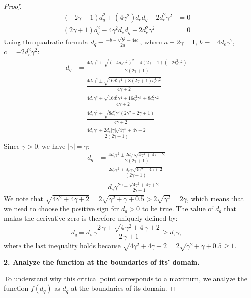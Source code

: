 \begin{proof}
\begin{align*}
(-2\gamma - 1) d_q^2 + (4\gamma^2) d_e d_q + 2d_e^2 \gamma^2 &= 0 \\
(2\gamma + 1) d_q^2 - 4\gamma^2 d_e d_q - 2d_e^2 \gamma^2 &= 0
\end{align*}
Using the quadratic formula $d_q = \frac{-b \pm \sqrt{b^2 - 4ac}}{2a}$, where $a = 2\gamma + 1$, $b = -4 d_e \gamma^2$, $c = -2 d_e^2 \gamma^2$:
\begin{align*}
d_q &= \frac{4 d_e \gamma^2 \pm \sqrt{(-4 d_e \gamma^2)^2 - 4 (2\gamma + 1) (-2 d_e^2 \gamma^2)}}{2 (2\gamma + 1)} \\
&= \frac{4 d_e \gamma^2 \pm \sqrt{16 d_e^2 \gamma^4 + 8 (2\gamma + 1) d_e^2 \gamma^2}}{4\gamma + 2} \\
&= \frac{4 d_e \gamma^2 \pm \sqrt{16 d_e^2 \gamma^4 + 16 d_e^2 \gamma^3 + 8 d_e^2 \gamma^2}}{4\gamma + 2} \\
&= \frac{4 d_e \gamma^2 \pm \sqrt{8 d_e^2 \gamma^2 (2\gamma^2 + 2\gamma + 1)}}{4\gamma + 2} \\
&= \frac{4 d_e \gamma^2 \pm 2 d_e |\gamma| \sqrt{4\gamma^2 + 4\gamma + 2}}{2(2\gamma + 1)}
\end{align*}
Since $\gamma > 0$, we have $|\gamma| = \gamma$:
\begin{align*}
d_q &= \frac{4 d_e \gamma^2 \pm 2 d_e \gamma \sqrt{4\gamma^2 + 4\gamma + 2}}{2(2\gamma + 1)} \\
&= \frac{2 d_e \gamma^2 \pm d_e \gamma \sqrt{4\gamma^2 + 4\gamma + 2}}{(2\gamma + 1)} \\
&= d_e \gamma \frac{2\gamma \pm \sqrt{4\gamma^2 + 4\gamma + 2}}{2\gamma + 1}
\end{align*}
We note that $\sqrt{4\gamma^2 + 4\gamma + 2} = 2\sqrt{\gamma^2 + \gamma + 0.5} > 2\sqrt{\gamma^2} = 2\gamma$, which means that we need to choose the positive sign for $d_q>0$ to be true.
The value of $d_q$ that makes the derivative zero is therefore uniquely defined by:
\begin{equation*}
d_q = d_e\,\gamma \frac{2\,\gamma + \sqrt{4\,\gamma^2 +4\,\gamma +2}}{2\,\gamma +1} \ge d_e \gamma,
\end{equation*}
where the last inequality holds because $\sqrt{4\gamma^2 + 4\gamma + 2} = 2\sqrt{\gamma^2 + \gamma + 0.5} \ge 1$.

\textbf{2. Analyze the function at the boundaries of its' domain.}

To understand why this critical point corresponds to a maximum, we analyze the function $f(d_q)$ as $d_q$ at the boundaries of its domain.


\end{proof}
